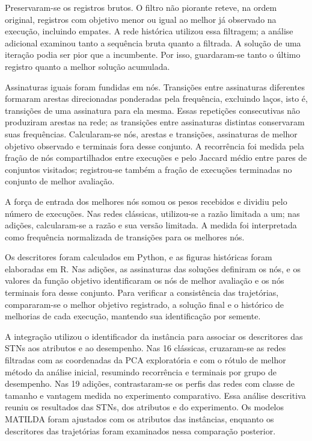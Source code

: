 Preservaram-se os registros brutos. O filtro não piorante reteve, na ordem
original, registros com objetivo menor ou igual ao melhor já observado
na execução, incluindo empates. A rede histórica utilizou essa filtragem;
a análise adicional examinou tanto a sequência bruta quanto a filtrada.
A solução de uma iteração podia ser pior que a incumbente. Por isso,
guardaram-se tanto o último registro quanto a melhor solução acumulada.

Assinaturas iguais foram fundidas em nós. Transições entre assinaturas
diferentes formaram arestas direcionadas ponderadas pela frequência,
excluindo laços, isto é, transições de uma assinatura para ela mesma.
Essas repetições consecutivas não produziram arestas na rede;
as transições entre assinaturas distintas conservaram suas frequências. Calcularam-se nós, arestas e transições, assinaturas
de melhor objetivo observado e terminais fora desse conjunto. A recorrência
foi medida pela fração de nós compartilhados entre execuções e pelo Jaccard
médio entre pares de conjuntos visitados; registrou-se também a fração de
execuções terminadas no conjunto de melhor avaliação.

A força de entrada dos melhores nós somou os pesos recebidos e dividiu
pelo número de execuções. Nas redes clássicas, utilizou-se a razão limitada
a um; nas adições, calcularam-se a razão e sua versão limitada. A medida foi
interpretada como frequência normalizada de transições para os melhores nós.

Os descritores foram calculados em Python, e as figuras históricas foram
elaboradas em R. Nas adições, as assinaturas das soluções definiram os nós,
e os valores da função objetivo identificaram os nós de melhor avaliação
e os nós terminais fora desse conjunto. Para verificar a consistência das
trajetórias, compararam-se o melhor objetivo registrado, a solução final
e o histórico de melhorias de cada execução, mantendo sua identificação
por semente.

A integração utilizou o identificador da instância para associar os
descritores das STNs aos atributos e ao desempenho. Nas 16 clássicas,
cruzaram-se as redes filtradas com as coordenadas da PCA exploratória e
com o rótulo de melhor método da análise inicial, resumindo recorrência e
terminais por grupo de desempenho. Nas 19 adições, contrastaram-se os
perfis das redes com classe de tamanho e vantagem medida no experimento
comparativo. Essa análise descritiva reuniu os resultados das STNs, dos
atributos e do experimento. Os modelos MATILDA foram ajustados com os atributos
das instâncias, enquanto os descritores das trajetórias foram examinados
nessa comparação posterior.

